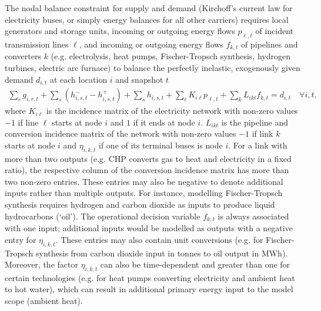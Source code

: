 The nodal balance constraint for supply and demand (Kirchoff's current law for
electricity buses, or simply energy balances for all other carriers) requires
local generators and storage units, incoming or outgoing energy flows
$p_{\ell,t}$ of incident transmission lines $\ell$, and incoming or outgoing
energy flows $f_{k,t}$ of pipelines and converters $k$ (e.g. electrolysis, heat pumps,
Fischer-Tropsch synthesis, hydrogen turbines, electric arc furnace) to balance the
perfectly inelastic, exogenously given demand $d_{i,t}$ at each location $i$ and
snapshot $t$
\begin{align}
    \sum_r g_{i,r,t} + \sum_s \left(h_{i,s,t}^- - h_{i,s,t}^+ \right) + \sum_s h_{i,s,t} + \sum_\ell K_{i\ell} p_{\ell,t} + \sum_k L_{ikt} f_{k,t} = d_{i,t}\quad \forall i,t, \label{eq:balance}
\end{align}
where $K_{i\ell}$ is the incidence matrix of the electricity network with
non-zero values $-1$ if line $\ell$ starts at node $i$ and $1$ if it ends at
node $i$. $L_{ikt}$ is the pipeline and conversion incidence matrix of the network with non-zero
values $-1$ if link $k$ starts at node $i$ and $\eta_{i,k,t}$ if one of its
terminal buses is node $i$. For a link with more than two outputs (e.g. CHP
converts gas to heat and electricity in a fixed ratio), the respective column of
the conversion incidence matrix has more than two non-zero entries. These entries may
also be negative to denote additional inputs rather than multiple outputs. For
instance, modelling Fischer-Tropsch synthesis requires hydrogen and carbon
dioxide as inputs to produce liquid hydrocarbons (`oil'). The operational
decision variable $f_{k,t}$ is always associated with one input; additional
inputs would be modelled as outputs with a negative entry for $\eta_{i,k,t}$.
These entries may also contain unit conversions (e.g. for Fischer-Tropsch
synthesis from carbon dioxide input in tonnes to oil output in MWh). Moreover,
the factor $\eta_{i,k,t}$ can also be time-dependent and greater than one for
certain technologies (e.g. for heat pumps converting electricity and ambient
heat to hot water), which can result in additional primary energy input to the
model scope (ambient heat).


